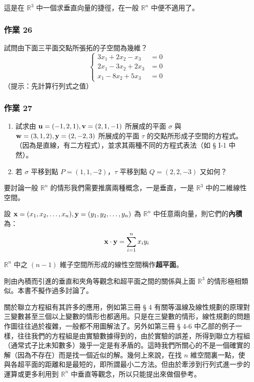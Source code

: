 這是在 $\mathbb{R}^3$ 中一個求垂直向量的捷徑，在一般 $\mathbb{R}^n$ 中便不適用了。

\subsubsection*{作業 26}\label{hw:b6-1-26}
試問由下面三平面交點所張拓的子空間為幾維？
\[ \left\{\begin{aligned}
3x_1 + 2x_2 - x_3 &= 0 \\
2x_1 - 3x_2 + 2x_3 &= 0 \\
x_1 - 8x_2 + 5x_3 &= 0
\end{aligned}\right. \]
（提示：先計算行列式之值）

\subsubsection*{作業 27}\label{hw:b6-1-27}
\begin{enumerate}[label=(\roman*), leftmargin=2em]
  \item 試求由 $\boldsymbol{\mathbf{u}}=(-1, 2, 1), \boldsymbol{\mathbf{v}}=(2, 1, -1)$ 所展成的平面 $\sigma$ 與 $\boldsymbol{\mathbf{w}}=(3, 1, 2), \boldsymbol{\mathbf{y}}=(2, -2, 3)$ 所展成的平面 $\tau$ 的交點所形成子空間的方程式。（因為是直線，有二方程式），並求其兩種不同的方程式表法（如 § I-1 中然）。
  \item 若 $\sigma$ 平移到點 $P=(1, 1, -2)$，$\tau$ 平移到點 $Q=(2, 2, -3)$ 又如何？
\end{enumerate}

要討論一般 $\mathbb{R}^n$ 的情形我們需要推廣兩種概念，一是垂直，一是 $\mathbb{R}^3$ 中的二維線性空間。

\begin{definition*}[**]\label{def:b6-1-inner}
設 $\boldsymbol{\mathbf{x}}=(x_1, x_2, \dots, x_n), \boldsymbol{\mathbf{y}}=(y_1, y_2, \dots, y_n)$ 為 $\mathbb{R}^n$ 中任意兩向量，則它們的\textbf{內積}為：
\begin{equation}
\boldsymbol{\mathbf{x}} \cdot \boldsymbol{\mathbf{y}} = \sum_{i=1}^n x_i y_i \label{eq:b6-1-8-14}
\end{equation}
\end{definition*}

\begin{definition*}[**]\label{def:b6-1-hyperplane}
$\mathbb{R}^n$ 中之 $(n-1)$ 維子空間所形成的線性空間稱作\textbf{超平面}。
\end{definition*}

則由內積而引進的垂直和夾角等觀念和超平面之間的關係與上面 $\mathbb{R}^3$ 的情形極相類似。本書不擬作過多討論了。

關於聯立方程組有其許多的應用，例如第三冊 § 4 有關等溫線及線性規劃的原理對三變數甚至三個以上變數的情形也都適用。只是在三變數的情形，線性規劃的問題作圖往往過於複雜，一般都不用圖解法了。另外如第三冊 § 4-6 中乙部的例子一樣，往往我們的方程組是由實驗數據得到的，由於實驗的誤差，所得到聯立方程組（通常式子比未知數多）幾乎一定是有矛盾的。這時我們所關心的不是一個確實的解（因為不存在）而是找一個近似的解。幾何上來說，在找 $n$ 維空間裏一點，使與各超平面的距離和是最短的，即所謂最小二方法。但由於牽涉到行列式進一步的運算或更多利用到 $\mathbb{R}^n$ 中垂直等觀念，所以只能提出來做個參考。

